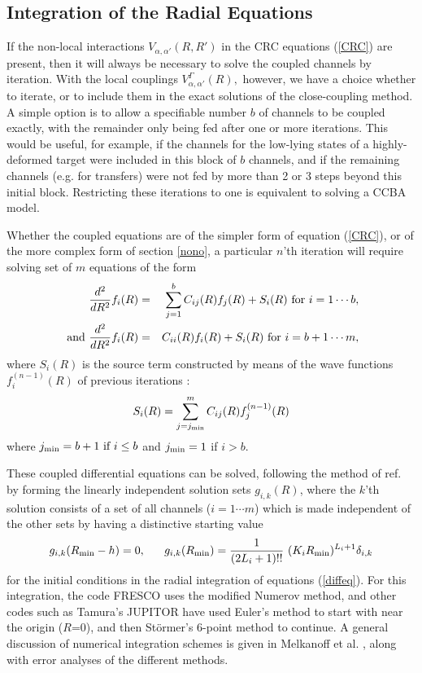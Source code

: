 \documentclass[11pt,a4paper]{article}
\begin{document}
\subsection{Integration of the Radial Equations}
\label{ExCC}

If the non-local interactions $ V_{\alpha ,\alpha'} (R,R')$
in the CRC equations (\ref{CRC}) are present, then it will always be necessary
to solve the coupled channels by iteration. With the local couplings
$ V_{\alpha ,\alpha'}^\Gamma (R), $ however, we have a choice
whether to iterate, or to include them in the exact solutions of
the close-coupling method.  A simple option is to allow a specifiable
number $b$ of channels to be coupled
exactly, with the remainder only being fed after one or more iterations.
This would be useful, for example, if the channels for the low-lying
states of a highly-deformed target were included in this block of $b$
channels, and if the remaining channels (e.g. for transfers) were not fed
by more than 2 or 3 steps beyond this initial block.
Restricting these iterations to one is equivalent to solving a CCBA model.

Whether the coupled equations are of the simpler form of equation (\ref{CRC}),
or of the more complex form of section \ref{nono}, a particular $n$'th
iteration will require solving set of $m$ equations of the form
\begin{eqnarray} \label{diffeq}
  {d^2 \over dR^2} f_i (R) &=& \sum _ {j=1} ^ b
      C_{ij} (R) f_j (R) + S_i (R)
    \mbox{  for } i=1 \cdots b ,
\\
 \mbox{  and } {d^2 \over dR^2} f_i (R) &=&
      C_{ii} (R) f_i (R) + S_i (R)
    \mbox{  for } i=b+1 \cdots m ,
\end{eqnarray}
where $ S_i (R) $ is the source term constructed by means of the
wave functions $ f_i^{(n-1)} (R) $ of previous iterations :
\begin{eqnarray}
    S_i (R) = \sum_{j = j_{\rm min}}^ m
                  C_{ij} (R) f_j^{(n-1)} (R)
\end{eqnarray}
where $ j_{\rm min} = b+1 \mbox{ if } i \leq b $ and
$ j_{\rm min} = 1 $ if $ i> b. $

These coupled differential equations can be solved, following the method
of ref. \cite{BSH} by forming the linearly independent solution
sets $ g_{i,k} (R) $, where the $k$'th solution consists of
a set of all channels ($i=1 \cdots m$) which is made independent of
the other sets by having a distinctive starting value
\begin{eqnarray} \label{rstart}
    g_{i,k} (R_{\rm min} - h) = 0, ~~~~~
    g_{i,k} (R_{\rm min}) = {1 \over (2L_i + 1)!!} ~
       (K_i R_{\rm min})^{L_i + 1} \delta_{i,k}
\end{eqnarray}
for the initial conditions in the radial integration of equations (\ref{diffeq}).
For this integration, the code FRESCO uses the modified Numerov method,
and other codes such as Tamura's JUPITOR \cite{tam67}
have used Euler's method to start with near the origin ($R$=0),
and then St\"ormer's 6-point method to continue.
A general discussion of numerical integration schemes
is given in Melkanoff et al. \cite{melk66}, along with error analyses of the different methods.
\end{document}
